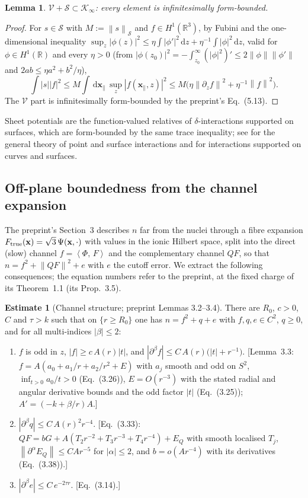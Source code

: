 \documentclass[11pt,a4paper]{article}
\theoremstyle{plain}
\newtheorem{lemma}[theorem]{Lemma}
\theoremstyle{definition}
\newtheorem{estimate}[theorem]{Estimate}
\theoremstyle{remark}
\newcommand{\R}{\mathbb{R}}
\newcommand{\VV}{\mathcal{V}}
\newcommand{\KK}{\mathcal{K}}
\renewcommand{\SS}{\mathcal{S}}
\newcommand{\dd}{\,\mathrm{d}}
\newcommand{\norm}[1]{\left\|#1\right\|}
\newcommand{\ip}[2]{\left\langle #1,\,#2\right\rangle}
\begin{document}
\begin{lemma}\label{lem:sheet}
$\VV+\SS\subset\KK_\infty$: every element is infinitesimally form-bounded.
\end{lemma}
\begin{proof}
For $s\in\SS$ with $M:=\norm s_\SS$ and $f\in H^1(\R^3)$, by Fubini and the one-dimensional inequality $\sup_z|\phi(z)|^2\le\eta\int|\phi'|^2\dd z+\eta^{-1}\int|\phi|^2\dd z$, valid for $\phi\in H^1(\R)$ and every $\eta>0$ (from $|\phi(z_0)|^2=-\int_{z_0}^\infty(|\phi|^2)'\le2\norm\phi\norm{\phi'}$ and $2ab\le\eta a^2+b^2/\eta$),
\[
\int|s||f|^2\le M\int\dd\mathbf x_\parallel\,\sup_z|f(\mathbf x_\parallel,z)|^2\le M\big(\eta\norm{\partial_zf}^2+\eta^{-1}\norm f^2\big).
\]
The $\VV$ part is infinitesimally form-bounded by the preprint's Eq.~(5.13).
\end{proof}

Sheet potentials are the function-valued relatives of $\delta$-interactions supported on surfaces, which are form-bounded by the same trace inequality; see \cite{AGHKH05} for the general theory of point and surface interactions and \cite{Exner08} for interactions supported on curves and surfaces.

\subsection{Off-plane boundedness from the channel expansion}
The preprint's Section~3 describes $n$ far from the nuclei through a fibre expansion $F_{\rm true}(\mathbf x)=\sqrt3\,\Psi(\mathbf x,\cdot)$ with values in the ionic Hilbert space, split into the direct (slow) channel $f=\ip{\Phi}{F}$ and the complementary channel $QF$, so that $n=f^2+\norm{QF}^2+e$ with $e$ the cutoff error. We extract the following consequences; the equation numbers refer to the preprint, at the fixed charge of its Theorem~1.1 (its Prop.~3.5).

\begin{estimate}[Channel structure; preprint Lemmas 3.2--3.4]\label{est:C}
There are $R_0$, $c>0$, $C$ and $\tau>k$ such that on $\{r\ge R_0\}$ one has $n=f^2+q+e$ with $f,q,e\in C^2$, $q\ge0$, and for all multi-indices $|\beta|\le2$:
\begin{enumerate}
\item[(C1)] $f$ is odd in $z$, $|f|\ge c\,A(r)|t|$, and $|\partial^\beta f|\le C\,A(r)\big(|t|+r^{-1}\big)$. [Lemma~3.3: $f=A(a_0+a_1/r+a_2/r^2+E)$ with $a_j$ smooth and odd on $S^2$, $\inf_{t>0}a_0/t>0$ (Eq.~(3.26)), $E=O(r^{-3})$ with the stated radial and angular derivative bounds and the odd factor $|t|$ (Eq.~(3.25)); $A'=(-k+\beta/r)A$.]
\item[(C2)] $|\partial^\beta q|\le C\,A(r)^2r^{-4}$. [Eq.~(3.33): $QF=bG+A(T_2r^{-2}+T_3r^{-3}+T_4r^{-4})+E_Q$ with smooth localised $T_j$, $\norm{\partial^\alpha E_Q}\le CAr^{-5}$ for $|\alpha|\le2$, and $b=o(Ar^{-4})$ with its derivatives (Eq.~(3.38)).]
\item[(C3)] $|\partial^\beta e|\le C\,e^{-2\tau r}$. [Eq.~(3.14).]
\end{enumerate}
\end{estimate}
\end{document}

